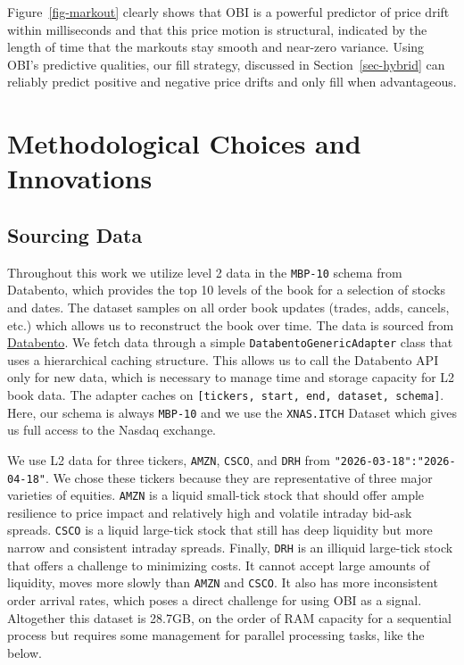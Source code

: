 \documentclass[
  letterpaper,
]{article}
\begin{document}
Figure~\ref{fig-markout} clearly shows that OBI is a powerful predictor
of price drift within milliseconds and that this price motion is
structural, indicated by the length of time that the markouts stay
smooth and near-zero variance. Using OBI's predictive qualities, our
fill strategy, discussed in Section~\ref{sec-hybrid} can reliably
predict positive and negative price drifts and only fill when
advantageous.

\section{Methodological Choices and
Innovations}\label{methodological-choices-and-innovations}

\subsection{Sourcing Data}\label{sourcing-data}

Throughout this work we utilize level 2 data in the \texttt{MBP-10}
schema from Databento, which provides the top 10 levels of the book for
a selection of stocks and dates. The dataset samples on all order book
updates (trades, adds, cancels, etc.) which allows us to reconstruct the
book over time. The data is sourced from
\href{https://databento.com/docs/schemas-and-data-formats/mbp-10?historical=python&live=python&reference=python}{Databento}.
We fetch data through a simple \texttt{DatabentoGenericAdapter} class
that uses a hierarchical caching structure. This allows us to call the
Databento API only for new data, which is necessary to manage time and
storage capacity for L2 book data. The adapter caches on
\texttt{{[}tickers,\ start,\ end,\ dataset,\ schema{]}}. Here, our
schema is always \texttt{MBP-10} and we use the \texttt{XNAS.ITCH}
Dataset which gives us full access to the Nasdaq exchange.

We use L2 data for three tickers, \texttt{AMZN}, \texttt{CSCO}, and
\texttt{DRH} from \texttt{"2026-03-18":"2026-04-18"}. We chose these
tickers because they are representative of three major varieties of
equities. \texttt{AMZN} is a liquid small-tick stock that should offer
ample resilience to price impact and relatively high and volatile
intraday bid-ask spreads. \texttt{CSCO} is a liquid large-tick stock
that still has deep liquidity but more narrow and consistent intraday
spreads. Finally, \texttt{DRH} is an illiquid large-tick stock that
offers a challenge to minimizing costs. It cannot accept large amounts
of liquidity, moves more slowly than \texttt{AMZN} and \texttt{CSCO}. It
also has more inconsistent order arrival rates, which poses a direct
challenge for using OBI as a signal. Altogether this dataset is 28.7GB,
on the order of RAM capacity for a sequential process but requires some
management for parallel processing tasks, like the below.
\end{document}

